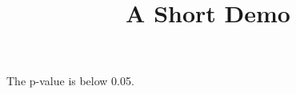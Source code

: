 \documentclass[article]{jss}
\title{A Short Demo}
\begin{document}
The p-value is below 0.05.
\end{document}
